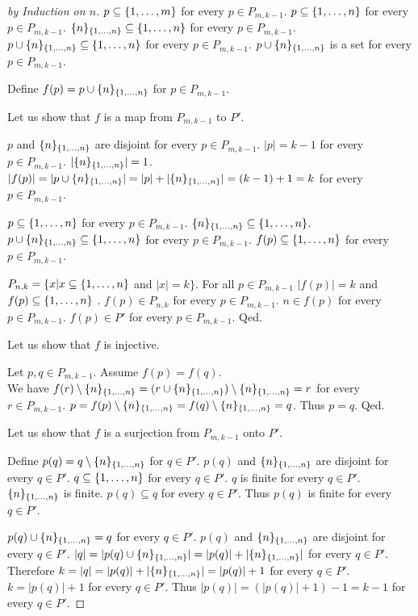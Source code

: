 \documentclass{article}
\begin{document}
\begin{forthel}
\begin{proof}[by Induction on $n$]
$p \subseteq \{1,\dots,m\}$ for every $p \in P_{m,k-1}$.
$p \subseteq \{1,\dots,n\}$ for every $p \in P_{m,k-1}$.
$\{n\}_{\{1,\dots,n\}} \subseteq \{1,\dots,n\}$ for every $p \in P_{m,k-1}$.
$p \cup \{n\}_{\{1,\dots,n\}} \subseteq \{1,\dots,n\}$ for every $p \in P_{m,k-1}$.
$p \cup \{n\}_{\{1,\dots,n\}}$ is a set for every $p \in P_{m,k-1}$.

Define $f(p) = p \cup \{n\}_{\{1,\dots,n\}}$ for $p \in P_{m,k-1}$.

Let us show that $f$ is a map from $P_{m,k-1}$ to $P'$.

$p$ and $\{n\}_{\{1,\dots,n\}}$ are disjoint for every $p \in P_{m,k-1}$.
$|p| = k-1$ for every $p \in P_{m,k-1}$.
$|\{n\}_{\{1,\dots,n\}}| = 1$.
$|f(p)| = |p \cup \{n\}_{\{1,\dots,n\}}| = |p| + |\{n\}_{\{1,\dots,n\}}| = (k-1)+1  = k$ for every $p \in P_{m,k-1}$.

$p \subseteq \{1,\dots,n\}$ for every $p \in P_{m,k-1}$.
$\{n\}_{\{1,\dots,n\}} \subseteq \{1,\dots,n\}$.
$p \cup \{n\}_{\{1,\dots,n\}} \subseteq \{1,\dots,n\}$ for every $p \in P_{m,k-1}$.
$f(p) \subseteq \{1,\dots,n\}$ for every $p \in P_{m,k-1}$.

$P_{n,k} = \{ x | x \subseteq \{1,\dots,n\}$ and $|x|=k \}$.
For all $p \in P_{m,k-1}$  $|f(p)| = k$ and $f(p) \subseteq \{1,\dots,n\}$
.
$f(p) \in P_{n,k}$ for every $p \in P_{m,k-1}$.
$n \in f(p)$ for every $p \in P_{m,k-1}$.
$f(p) \in P'$ for every $p \in P_{m,k-1}$.
Qed.

Let us show that $f$ is injective. 

   Let $p,q \in P_{m,k-1}$.
   Assume $f(p) = f(q)$. \\
   We have $f(r) \setminus \{n\}_{\{1,\dots,n\}} = (r \cup \{n\}_{\{1,\dots,n\}}) \setminus \{n\}_{\{1,\dots,n\}} = r$
   for every $r \in  P_{m,k-1}$.
   $p = f(p)\setminus \{n\}_{\{1,\dots,n\}} = f(q)\setminus \{n\}_{\{1,\dots,n\}} = q$.
   Thus $p=q$.
   Qed.
   
Let us show that $f$ is a surjection from $P_{m,k-1}$ onto $P'$.

   Define $p(q) = q \setminus \{n\}_{\{1,\dots,n\}}$ for $q \in P'$.
   $p(q)$ and $\{n\}_{\{1,\dots,n\}}$ are disjoint for every $q \in P'$.
   $q \subseteq \{1,\dots,n\}$ for every $q \in P'$.
   $q$ is finite for every $q \in P'$.
   $\{n\}_{\{1,\dots,n\}}$ is finite.
   $p(q) \subseteq q$ for every $q \in P'$.
   Thus $p(q)$ is finite for every $q \in P'$.
   
   $p(q) \cup \{n\}_{\{1,\dots,n\}} = q$ for every $q \in P'$.
   $p(q)$ and $\{n\}_{\{1,\dots,n\}}$ are disjoint for every $q\in P'$.
   $|q| = |p(q) \cup \{n\}_{\{1,\dots,n\}}|  =  |p(q)| + |\{n\}_{\{1,\dots,n\}}|$ for every $q \in P'$.
   Therefore $k = |q| = |p(q)| + |\{n\}_{\{1,\dots,n\}}| = |p(q)| + 1$ for every $q \in P'$.
   $k =  |p(q)| + 1$ for every $q \in P'$.
   Thus $|p(q)| = (|p(q)| + 1) -1 =  k-1$ for every $q \in P'$.
   

\end{proof}
\end{forthel}
\end{document}
